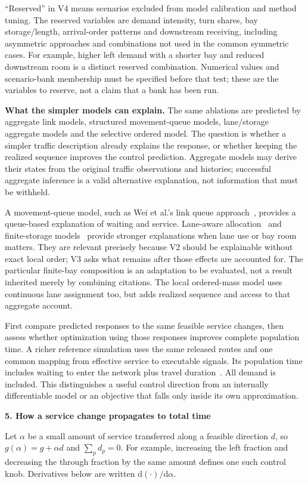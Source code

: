\documentclass[10pt,a4paper]{article}
\newcommand{\head}[1]{\par\vspace{4pt}\noindent\textbf{#1}\par\nobreak\vspace{1pt}}
\begin{document}
``Reserved'' in V4 means scenarios excluded from model calibration and
method tuning. The reserved variables are demand intensity, turn shares,
bay storage/length, arrival-order patterns and downstream receiving,
including asymmetric approaches and combinations not used in the common
symmetric cases. For example, higher left demand with a shorter bay and
reduced downstream room is a distinct reserved combination. Numerical
values and scenario-bank membership must be specified before that test;
these are the variables to reserve, not a claim that a bank has been run.

\textbf{What the simpler models can explain.} The same ablations are
predicted by aggregate link models, structured movement-queue models,
lane/storage aggregate models and the selective ordered model. The
question is whether a simpler traffic description already explains the
response, or whether keeping the realized sequence improves the control
prediction. Aggregate models may derive their states from the original
traffic observations and histories; successful aggregate inference is a
valid alternative explanation, not information that must be withheld.

A movement-queue model, such as Wei et al.'s link queue approach~\cite{wei},
provides a queue-based explanation of waiting and service. Lane-aware
allocation~\cite{gong} and finite-storage models~\cite{liu} provide
stronger explanations when lane use or bay room matters. They are relevant
precisely because V2 should be explainable without exact local order;
V3 asks what remains after those effects are accounted for. The particular
finite-bay composition is an adaptation to be evaluated, not a result
inherited merely by combining citations. The local ordered-mass model
uses continuous lane assignment too, but adds realized sequence and
access to that aggregate account.

First compare predicted responses to the same feasible service changes,
then assess whether optimization using those responses improves complete
population time. A richer reference simulation uses the same released
routes and one common mapping from effective service to executable
signals. Its population time includes waiting to enter the network plus
travel duration~\cite{sumo}. All demand is included. This distinguishes
a useful control direction from an internally differentiable model or
an objective that falls only inside its own approximation.
\par


\head{5. How a service change propagates to total time}
Let $\alpha$ be a small amount of service transferred along a feasible
direction $d$, so $g(\alpha)=g+\alpha d$ and $\sum_p d_p=0$.
For example, increasing the left fraction and decreasing the through
fraction by the same amount defines one such control knob. Derivatives
below are written $\mathrm d(\cdot)/\mathrm d\alpha$.
\end{document}

